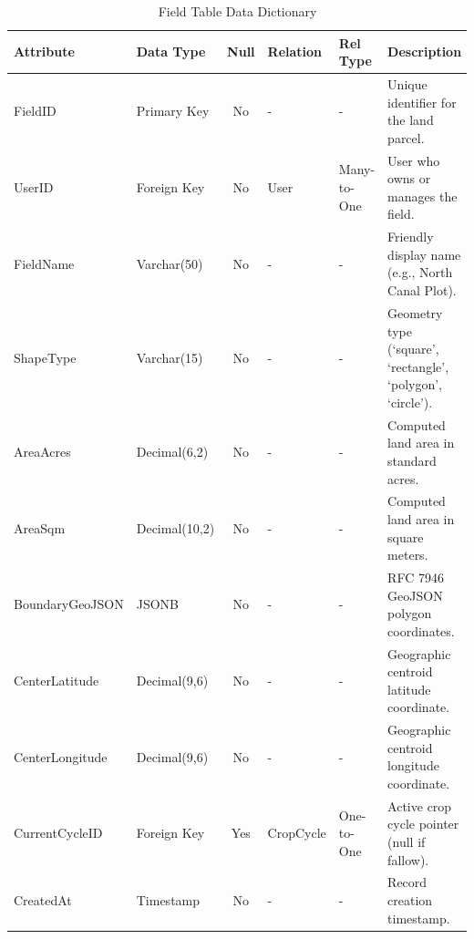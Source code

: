 \documentclass{FastFyp}
\begin{document}
\begin{table}[H]
\footnotesize
\centering
\caption{Field Table Data Dictionary}
\label{tab:field_table}
\begin{tabular}{|l|l|c|l|l|p{4.5cm}|}
\hline
\textbf{Attribute} & \textbf{Data Type} & \textbf{Null} & \textbf{Relation} & \textbf{Rel Type} & \textbf{Description} \\ \hline
FieldID & Primary Key & No & - & - & Unique identifier for the land parcel. \\ \hline
UserID & Foreign Key & No & User & Many-to-One & User who owns or manages the field. \\ \hline
FieldName & Varchar(50) & No & - & - & Friendly display name (e.g., North Canal Plot). \\ \hline
ShapeType & Varchar(15) & No & - & - & Geometry type (`square', `rectangle', `polygon', `circle'). \\ \hline
AreaAcres & Decimal(6,2) & No & - & - & Computed land area in standard acres. \\ \hline
AreaSqm & Decimal(10,2) & No & - & - & Computed land area in square meters. \\ \hline
BoundaryGeoJSON & JSONB & No & - & - & RFC 7946 GeoJSON polygon coordinates. \\ \hline
CenterLatitude & Decimal(9,6) & No & - & - & Geographic centroid latitude coordinate. \\ \hline
CenterLongitude & Decimal(9,6) & No & - & - & Geographic centroid longitude coordinate. \\ \hline
CurrentCycleID & Foreign Key & Yes & CropCycle & One-to-One & Active crop cycle pointer (null if fallow). \\ \hline
CreatedAt & Timestamp & No & - & - & Record creation timestamp. \\ \hline
\end{tabular}
\end{table}
\end{document}
